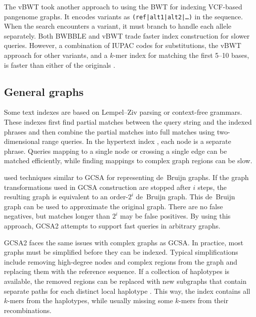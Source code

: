 The vBWT \cite{Maciuca_2016} took another approach to using the BWT for indexing VCF-based pangenome graphs.
It encodes variants as \texttt{(ref|alt1|alt2|\dots)} in the sequence.
When the search encounters a variant, it must branch to handle each allele separately.
Both BWBBLE and vBWT trade faster index construction for slower queries.
However, a combination of IUPAC codes for substitutions, the vBWT approach for other variants, and a $k$-mer index for matching the first 5--10 bases, is faster than either of the originals \cite{Buechler_2019}.

\subsection{General graphs}

Some text indexes are based on Lempel--Ziv parsing or context-free grammars.
These indexes first find partial matches between the query string and the indexed phrases and then combine the partial matches into full matches using two-dimensional range queries.
In the hypertext index \cite{Thachuk_2013}, each node is a separate phrase.
Queries mapping to a single node or crossing a single edge can be matched efficiently, while finding mappings to complex graph regions can be slow.

\citeauthor{Bowe_2012} \cite{Bowe_2012} used techniques similar to GCSA for representing de~Bruijn graphs.
If the graph transformations used in GCSA construction are stopped after $i$ steps, the resulting graph is equivalent to an order-$2^{i}$ de~Bruijn graph.
This de~Bruijn graph can be used to approximate the original graph.
There are no false negatives, but matches longer than $2^{i}$ may be false positives.
By using this approach, GCSA2 \cite{Siren_2017} attempts to support fast queries in arbitrary graphs.

GCSA2 faces the same issues with complex graphs as GCSA.
In practice, most graphs must be simplified before they can be indexed.
Typical simplifications include removing high-degree nodes and complex regions from the graph and replacing them with the reference sequence.
If a collection of haplotypes is available, the removed regions can be replaced with new subgraphs that contain separate paths for each distinct local haplotype \cite{Siren_2019}.
This way, the index contains all $k$-mers from the haplotypes, while usually missing some $k$-mers from their recombinations.

